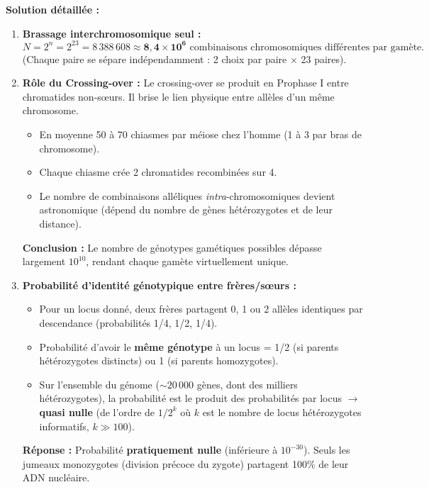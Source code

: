 \documentclass[11pt]{article}
\begin{document}
\begin{exoresolu}
    \tcblower
    \textbf{Solution détaillée :}
    \begin{enumerate}
        \item \textbf{Brassage interchromosomique seul :}
              \[ N = 2^n = 2^{23} = 8\,388\,608 \approx \mathbf{8,4 \times 10^6} \text{ combinaisons chromosomiques différentes par gamète.} \]
              (Chaque paire se sépare indépendamment : 2 choix par paire $\times$ 23 paires).
        \item \textbf{Rôle du Crossing-over :}
              Le crossing-over se produit en Prophase I entre chromatides non-sœurs. Il brise le lien physique entre allèles d'un même chromosome.
              \begin{itemize}
                  \item En moyenne 50 à 70 chiasmes par méiose chez l'homme (1 à 3 par bras de chromosome).
                  \item Chaque chiasme crée 2 chromatides recombinées sur 4.
                  \item Le nombre de combinaisons alléliques \emph{intra}-chromosomiques devient astronomique (dépend du nombre de gènes hétérozygotes et de leur distance).
              \end{itemize}
              \textbf{Conclusion :} Le nombre de génotypes gamétiques possibles dépasse largement $10^{10}$, rendant chaque gamète virtuellement unique.
        \item \textbf{Probabilité d'identité génotypique entre frères/sœurs :}
              \begin{itemize}
                  \item Pour un locus donné, deux frères partagent 0, 1 ou 2 allèles identiques par descendance (probabilités 1/4, 1/2, 1/4).
                  \item Probabilité d'avoir le \textbf{même génotype} à un locus = 1/2 (si parents hétérozygotes distincts) ou 1 (si parents homozygotes).
                  \item Sur l'ensemble du génome ($\sim 20\,000$ gènes, dont des milliers hétérozygotes), la probabilité est le produit des probabilités par locus $\rightarrow$ \textbf{quasi nulle} (de l'ordre de $1/2^{k}$ où $k$ est le nombre de locus hétérozygotes informatifs, $k \gg 100$).
              \end{itemize}
              \textbf{Réponse :} Probabilité \textbf{pratiquement nulle} (inférieure à $10^{-30}$). Seuls les jumeaux monozygotes (division précoce du zygote) partagent 100\% de leur ADN nucléaire.

\end{enumerate}
\end{exoresolu}
\end{document}
